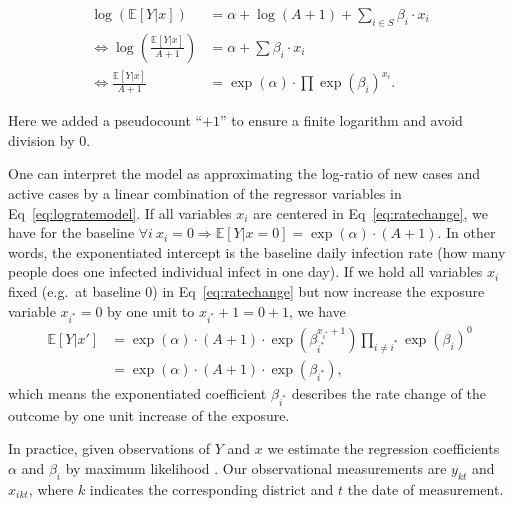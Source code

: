 \documentclass[10pt,letterpaper]{article}
\begin{document}
\begin{align}
\log(\mathbb{E}[Y|x]) &= \alpha + \log(A+1) + \sum_{i\in S}\beta_i\cdot x_{i} \nonumber \\
\Leftrightarrow \log(\frac{\mathbb{E}[Y|x]}{A+1}) &= \alpha + \sum\beta_i\cdot x_{i} \label{eq:logratemodel} \\
\Leftrightarrow \frac{\mathbb{E}[Y|x]}{A+1} &= \exp(\alpha)\cdot \prod \exp(\beta_i)^{x_i}. \label{eq:ratechange}
\end{align}

Here we added a pseudocount ``\(+1\)'' to ensure a finite logarithm and
avoid division by \(0\).

One can interpret the model as approximating the log-ratio of new cases
and active cases by a linear combination of the regressor variables in Eq~\eqref{eq:logratemodel}. If all variables \(x_i\) are centered in Eq~\eqref{eq:ratechange}, we have for the baseline
\(\forall i\ x_i=0 \Rightarrow \mathbb{E}[Y|x=0]=\exp(\alpha)\cdot (A+1)\).
In other words, the exponentiated intercept is the baseline daily
infection rate (how many people does one infected individual infect in
one day). If we hold all variables \(x_i\) fixed (e.g.~at baseline 0) in Eq~\eqref{eq:ratechange} but now increase the exposure variable
\(x_{i^{\ast}}=0\) by one unit to \(x_{i^{\ast}}+1=0+1\), we have
\begin{align*}
\mathbb{E}[Y|x']&=\exp(\alpha)\cdot(A+1)\cdot\exp(\beta_{i^{\ast}}^{x_{i^{\ast}}+1})\prod_{i\neq i^{\ast}}\exp(\beta_i)^0 \\
&=\exp(\alpha)\cdot(A+1)\cdot\exp(\beta_{i^{\ast}}),
\end{align*}
which means the exponentiated coefficient \(\beta_{i^{\ast}}\) describes
the rate change of the outcome by one unit increase of the exposure.

In practice, given observations of \(Y\) and \(x\) we estimate the
regression coefficients \(\alpha\) and \(\beta_i\) by maximum
likelihood \cite{maxlikelihood}. Our observational measurements are
\(y_{kt}\) and \(x_{ikt}\), where \(k\) indicates the corresponding
district and \(t\) the date of measurement.
\end{document}
